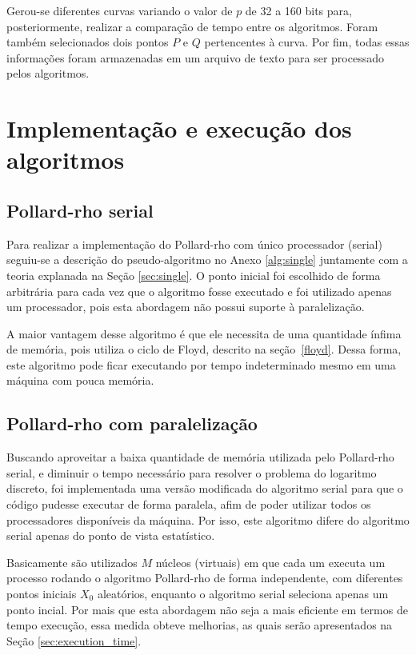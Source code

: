 Gerou-se diferentes curvas variando o valor de \(p\) de 32 a 160 bits para, posteriormente, realizar a comparação de tempo entre os algoritmos. Foram também selecionados dois pontos \(P\) e \(Q\) pertencentes à curva. Por fim, todas essas informações foram armazenadas em um arquivo de texto para ser processado pelos algoritmos.

\section{Implementação e execução dos algoritmos}

\subsection{Pollard-rho serial}
Para realizar a implementação do Pollard-rho com único processador (serial) seguiu-se a descrição do pseudo-algoritmo no Anexo \ref{alg:single} juntamente com a teoria explanada na Seção \ref{sec:single}. O ponto inicial foi escolhido de forma arbitrária para cada vez que o algoritmo fosse executado e foi utilizado apenas um processador, pois esta abordagem não possui suporte à paralelização.

A maior vantagem desse algoritmo é que ele necessita de uma quantidade ínfima de memória, pois utiliza o ciclo de Floyd, descrito na seção~\ref{floyd}. Dessa forma, este algoritmo pode ficar executando por tempo indeterminado mesmo em uma máquina com pouca memória.

\subsection{Pollard-rho com paralelização}
Buscando aproveitar a baixa quantidade de memória utilizada pelo Pollard-rho serial, e diminuir o tempo necessário para resolver o problema do logaritmo discreto, foi implementada uma versão modificada do algoritmo serial para que o código pudesse executar de forma paralela, afim de poder utilizar todos os processadores disponíveis da máquina. Por isso, este algoritmo difere do algoritmo serial apenas do ponto de vista estatístico.

Basicamente são utilizados \(M\) núcleos (virtuais) em que cada um executa um processo rodando o algoritmo Pollard-rho de forma independente, com diferentes pontos iniciais \(X_0\) aleatórios, enquanto o algoritmo serial seleciona apenas um ponto incial. Por mais que esta abordagem não seja a mais eficiente em termos de tempo execução, essa medida obteve melhorias, as quais serão apresentados na Seção \ref{sec:execution_time}.

